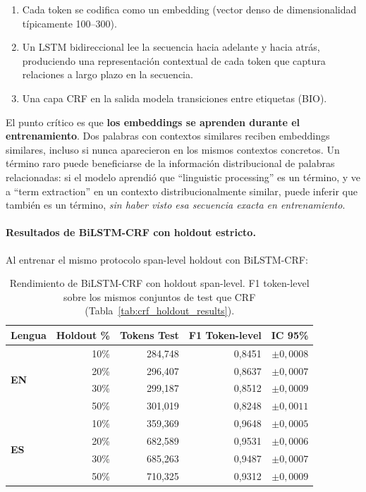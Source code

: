 \begin{enumerate}
    \item Cada token se codifica como un embedding (vector denso de dimensionalidad típicamente 100--300).
    \item Un LSTM bidireccional lee la secuencia hacia adelante y hacia atrás, produciendo una representación contextual de cada token que captura relaciones a largo plazo en la secuencia.
    \item Una capa CRF en la salida modela transiciones entre etiquetas (BIO).
\end{enumerate}

El punto crítico es que \textbf{los embeddings se aprenden durante el entrenamiento}. Dos palabras con contextos similares reciben embeddings similares, incluso si nunca aparecieron en los mismos contextos concretos. Un término raro puede beneficiarse de la información distribucional de palabras relacionadas: si el modelo aprendió que ``linguistic processing'' es un término, y ve a ``term extraction'' en un contexto distribucionalmente similar, puede inferir que también es un término, \emph{sin haber visto esa secuencia exacta en entrenamiento}.

\paragraph{Resultados de BiLSTM-CRF con holdout estricto.}
Al entrenar el mismo protocolo span-level holdout con BiLSTM-CRF:

\begin{table}[H]
\centering
\small
\caption{Rendimiento de BiLSTM-CRF con holdout span-level. F1 token-level sobre los mismos conjuntos de test que CRF (Tabla~\ref{tab:crf_holdout_results}).}
\label{tab:bilstm_holdout_results}
\begin{tabular}{@{} l r r r r @{}}
\toprule
\textbf{Lengua} & \textbf{Holdout \%} & \textbf{Tokens Test} & \textbf{F1 Token-level} & \textbf{IC 95\%} \\
\midrule
\multirow{4}{*}{\textbf{EN}} & 10\% & 284{,}748 & 0{,}8451 & $\pm 0{,}0008$ \\
 & 20\% & 296{,}407 & 0{,}8637 & $\pm 0{,}0007$ \\
 & 30\% & 299{,}187 & 0{,}8512 & $\pm 0{,}0009$ \\
 & 50\% & 301{,}019 & 0{,}8248 & $\pm 0{,}0011$ \\
\midrule
\multirow{4}{*}{\textbf{ES}} & 10\% & 359{,}369 & 0{,}9648 & $\pm 0{,}0005$ \\
 & 20\% & 682{,}589 & 0{,}9531 & $\pm 0{,}0006$ \\
 & 30\% & 685{,}263 & 0{,}9487 & $\pm 0{,}0007$ \\
 & 50\% & 710{,}325 & 0{,}9312 & $\pm 0{,}0009$ \\
\bottomrule
\end{tabular}
\end{table}

